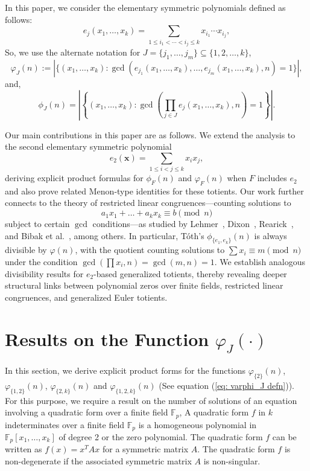 \documentclass[12pt]{article}
\begin{document}
In this paper, we consider the elementary symmetric polynomials defined as follows:
\[
e_j(x_1, \dots, x_k) = \sum_{1 \leq i_1 < \cdots < i_j \leq k} x_{i_1} \cdots x_{i_j},
\]
So, we use the alternate notation for $J=\{j_1,\dots, j_m\}\subseteq \{1,2,\dots,k\}$,
\begin{equation}\label{eq: varphi_J defn}
\varphi_J(n):=|\{(x_1,\dots, x_k): \gcd(e_{j_1}(x_1,\dots, x_k),\dots, e_{j_m}(x_1,\dots, x_k), n)=1\}|,    
\end{equation}
and,
\begin{equation}\label{eq: phi_J defn}
\phi_J(n)=\left|\left\{(x_1,\dots, x_k): \gcd\left(\prod_{j\in J}e_j(x_1,\dots, x_k), n\right)=1\right\}\right|.
\end{equation}

Our main contributions in this paper are as follows. We extend the analysis to the second elementary symmetric polynomial
\[
e_2(\mathbf{x}) = \sum_{1 \leq i < j \leq k} x_i x_j,
\]
deriving explicit product formulas for $\phi_F(n)$ and $\varphi_F(n)$ when $F$ includes $e_2$ and also prove related Menon-type identities for these totients. Our work further connects to the theory of restricted linear congruences---counting solutions to
\[
a_1 x_1 + \dots + a_k x_k \equiv b \pmod{n}
\]
subject to certain $\gcd$ conditions---as studied by Lehmer~\cite{lehmer1913certain}, Dixon~\cite{dixon1960finite}, Rearick~\cite{rearick1963linear}, and Bibak et al.~\cite{bibak2017restricted}, among others. In particular, T\'oth's $\phi_{\{e_1, e_k\}}(n)$ is always divisible by $\varphi(n)$, with the quotient counting solutions to $\sum x_i \equiv m \pmod{n}$ under the condition $\gcd(\prod x_i, n) = \gcd(m, n) = 1$. We establish analogous divisibility results for $e_2$-based generalized totients, thereby revealing deeper structural links between polynomial zeros over finite fields, restricted linear congruences, and generalized Euler totients.

\section{Results on the Function \texorpdfstring{$\varphi_J(\cdot)$}{the weaker totient function}}

 In this section, we derive explicit product forms for the functions $\varphi_{\{2\}}(n)$, $\varphi_{\{1,2\}}(n)$, $\varphi_{\{2,k\}}(n)$ and $\varphi_{\{1,2,k\}}(n)$ (See equation (\ref{eq: varphi_J defn})). For this purpose, we require a result on the number of solutions of an equation involving a quadratic form over a finite field $\mathbb{F}_p$,
A quadratic form $f$ in $k$ indeterminates over a finite field $\mathbb{F}_p$ is a homogeneous polynomial in $\mathbb{F}_p[x_1,\dots, x_k]$ of degree 2 or the zero polynomial. The quadratic form $f$ can be written as $f(x)=x^TAx$ for a symmetric matrix $A$. The quadratic form $f$ is non-degenerate if the associated symmetric matrix $A$ is non-singular.
\end{document}
